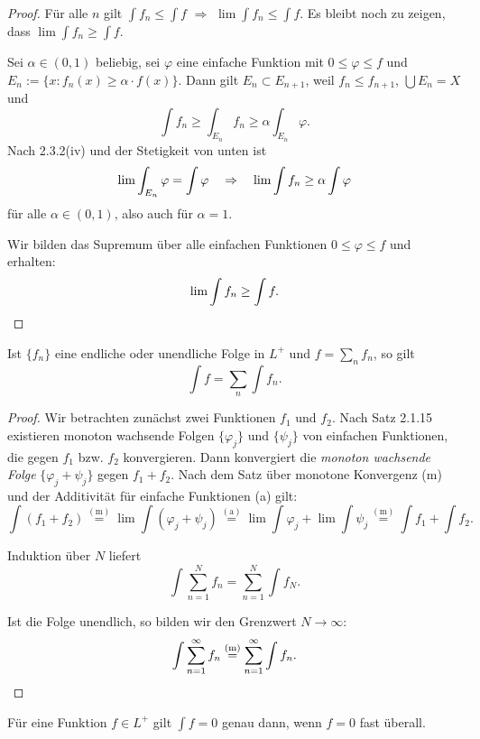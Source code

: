 \begin{proof}
 Für alle $n$ gilt $\int f_n \le \int f$ $\Rightarrow$ $\lim \int f_n \le \int f$. Es bleibt noch zu zeigen, dass $\lim \int f_n \ge \int f$. 
 
 Sei $\alpha \in (0,1)$ beliebig, sei $\varphi$ eine einfache Funktion mit $0 \le \varphi \le f$ und $E_n := \{ x : f_n(x) \ge \alpha \cdot f(x) \}$. Dann gilt $E_n \subset E_{n+1}$, weil $f_n \le f_{n+1}$, $\bigcup E_n = X$ und
 \[ \int f_n \ge \int_{E_n} f_n \ge \alpha \int_{E_n} \varphi. \]
 Nach 2.3.2(iv) und der Stetigkeit von unten ist
 \[ \lim \int_{E_n} \varphi = \int \varphi \quad \Rightarrow \quad \lim \int f_n \ge \alpha \int \varphi \]
 für alle $\alpha \in (0,1)$, also auch für $\alpha = 1$. 
 
 Wir bilden das Supremum über alle einfachen Funktionen $0 \le \varphi \le f$ und erhalten:
 \[ \lim \int f_n \ge \int f. \qedhere \]
\end{proof}

\begin{thm}
 Ist $\{ f_n \}$ eine endliche oder unendliche Folge in $L^+$ und $f = \sum_n f_n$, so gilt
 \[ \int f =  \sum_n \int f_n. \]
\end{thm}

\begin{proof}
 Wir betrachten zunächst zwei Funktionen $f_1$ und $f_2$. Nach Satz 2.1.15 existieren monoton wachsende  Folgen $\{ \varphi_j \}$ und $\{ \psi_j \}$ von einfachen Funktionen, die gegen $f_1$ bzw. $f_2$ konvergieren. Dann konvergiert die \emph{monoton wachsende Folge} $\{ \varphi_j + \psi_j \}$ gegen $f_1 + f_2$. Nach dem Satz über monotone Konvergenz (m) und der Additivität für einfache Funktionen (a) gilt:
 \[ \int (f_1 + f_2 ) \overset{(\text{m})}{=} \lim \int (\varphi_j + \psi_j) \overset{(\text{a})}{=} \lim \int \varphi_j + \lim \int \psi_j \overset{(\text{m})}{=} \int f_1 + \int f_2. \]
 
 Induktion über $N$ liefert
 \[ \int \sum_{n=1}^N f_n = \sum_{n=1}^N \int f_N. \]
 
 Ist die Folge unendlich, so bilden wir den Grenzwert $N \to \infty$:
 \[ \int \sum_{n=1}^\infty f_n \overset{(\text{m})}{=} \sum_{n=1}^\infty \int f_n. \qedhere \]
\end{proof}

\begin{thm}
 Für eine Funktion $f \in L^+$ gilt $\int f = 0$ genau dann, wenn $f=0$ fast überall.
\end{thm}

